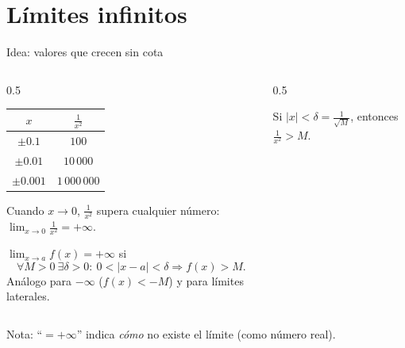 \documentclass[10pt,aspectratio=169]{beamer}
\begin{document}
\section{Límites infinitos}

\begin{frame}{Idea: valores que crecen sin cota}
  \begin{columns}
    \begin{column}{0.5\textwidth}
      \begin{center}
        \small
        \begin{tabular}{c|c}
          $x$ & $\frac1{x^2}$\\ \hline
          $\pm0.1$ & $100$\\
          $\pm0.01$ & $10\,000$\\
          $\pm0.001$ & $1\,000\,000$
        \end{tabular}
      \end{center}
      Cuando $x\to0$, $\frac1{x^2}$ supera cualquier número: \ $\displaystyle\lim_{x\to0}\frac1{x^2}=+\infty$.
      \begin{definicion}
        $\displaystyle\lim_{x\to a}f(x)=+\infty$ si
        \[ \forall M>0\ \exists\delta>0:\ 0<|x-a|<\delta\Rightarrow f(x)>M. \]
        Análogo para $-\infty$ ($f(x)<-M$) y para límites laterales.
      \end{definicion}
    \end{column}
    \begin{column}{0.5\textwidth}
      \centering

      \small Si $|x|<\delta=\frac{1}{\sqrt M}$, entonces $\frac1{x^2}>M$.
    \end{column}
  \end{columns}
  \small \alert{Nota:} ``$=+\infty$'' indica \emph{cómo} no existe el límite (como número real).
\end{frame}
\end{document}
